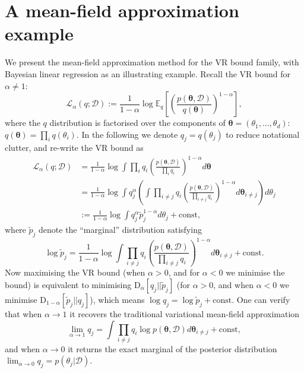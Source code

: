 \section{A mean-field approximation example}
\label{sec:mean_field}

We present the mean-field approximation method for the VR bound family, with Bayesian linear regression as an illustrating example. Recall the VR bound for $\alpha \neq 1$:
\begin{equation}
\mathcal{L}_{\alpha}(q; \mathcal{D}) := \frac{1}{1 - \alpha} \log \mathbb{E}_{q} \left[ \left( \frac{p(\bm{\theta}, \mathcal{D})}{q(\bm{\theta})} \right)^{1 - \alpha} \right],
\label{eq:alpha_vi}
\end{equation}
where the $q$ distribution is factorised over the components of $\bm{\theta} = (\theta_1, ..., \theta_d)$: $q(\bm{\theta}) = \prod_{i} q(\theta_i)$. In the following we denote $q_j = q(\theta_j)$ to reduce notational clutter, and re-write the VR bound as
\begin{equation*}
\begin{aligned}
\mathcal{L}_{\alpha}(q; \mathcal{D}) &= \frac{1}{1 - \alpha} \log \int \prod_i q_i  \left( \frac{p(\bm{\theta}, \mathcal{D})}{\prod_i q_i} \right)^{1 - \alpha} d\bm{\theta} \\
&= \frac{1}{1 - \alpha} \log \int q_j^{\alpha} \left( \int \prod_{i \neq j} q_i  \left( \frac{p(\bm{\theta}, \mathcal{D})}{\prod_{i \neq j} q_i} \right)^{1 - \alpha} d\bm{\theta}_{i \neq j} \right) d\theta_j \\
&:= \frac{1}{1 - \alpha} \log \int q_j^{\alpha} \tilde{p}_j^{1 - \alpha} d\theta_j + \text{const},
\end{aligned}
\end{equation*}
where $\tilde{p}_j$ denote the ``marginal'' distribution satisfying
\begin{equation*}
\log \tilde{p}_j = \frac{1}{1 - \alpha} \log \int \prod_{i \neq j} q_i  \left( \frac{p(\bm{\theta}, \mathcal{D})}{\prod_{i \neq j} q_i} \right)^{1 - \alpha} d\bm{\theta}_{i \neq j} + \text{const}.
\end{equation*}
Now maximising the VR bound (when $\alpha > 0$, and for $\alpha < 0$ we minimise the bound) is equivalent to minimising $\mathrm{D}_{\alpha}[q_j||\tilde{p}_j]$ (for $\alpha > 0$, and when $\alpha < 0$ we minimise $\mathrm{D}_{1 - \alpha}[\tilde{p}_j||q_j]$), which means $\log q_j = \log \tilde{p}_j + \text{const}$. One can verify that when $\alpha \rightarrow 1$ it recovers the traditional variational mean-field approximation
\begin{equation*}
\lim_{\alpha \rightarrow 1} q_j = \int \prod_{i \neq j} q_i \log p(\bm{\theta}, \mathcal{D}) d\bm{\theta}_{i \neq j} + \text{const},
\end{equation*}
and when $\alpha \rightarrow 0$ it returns the exact marginal of the posterior distribution $\lim_{\alpha \rightarrow 0} q_j = p(\theta_j |\mathcal{D})$.

